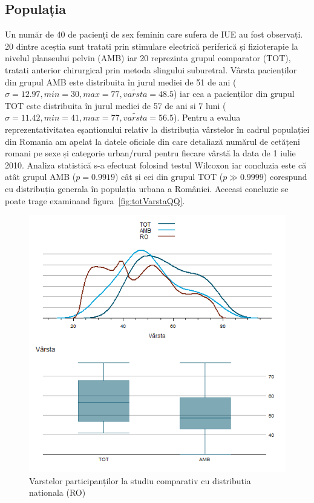 \documentclass[12pt]{article}
\begin{document}
\subsection{Populația}
 \label{rezPop}
  Un număr de 40 de pacienți de sex feminin care sufera de \ac{IUE} au fost observați. 20 dintre aceștia sunt tratati prin stimulare electrică periferică și fizioterapie la nivelul planseului pelvin (AMB) iar 20 reprezinta grupul comparator (TOT), tratati anterior chirurgical prin metoda slingului suburetral.
  Vârsta pacienților din grupul AMB este distribuita în jurul mediei de 51 de ani ($\sigma=12.97,min=30,max=77,\tilde{varsta}=48.5$) iar cea a pacienților din grupul TOT este distribuita în jurul mediei de 57 de ani si 7 luni ($\sigma=11.42,min=41,max=77,\tilde{varsta}=56.5$).
  Pentru a evalua reprezentativitatea eșantionului relativ la distribuția vârstelor în cadrul populației din Romania am apelat la datele oficiale din \citep{insee2011} care detaliază numărul de cetățeni romani pe sexe și categorie urban/rural pentru fiecare vârstă la data de 1 iulie 2010. 
  Analiza statistică s-a efectuat folosind testul Wilcoxon iar concluzia este că atât grupul AMB ($p=0.9919$) cât și cei din grupul TOT ($p\gg0.9999$) corespund cu distribuția generala în populația urbana a României. Aceeasi concluzie se poate trage examinand figura~\ref{fig:totVarstaQQ}.
  \begin{figure}[H]
   \centering
   \includegraphics[width=0.8\linewidth]{totVarstaGrup}
   \caption{Varstelor participanților la studiu comparativ cu distributia nationala (RO)}
   \label{fig:totVarstaGrup}
  \end{figure}
\end{document}
